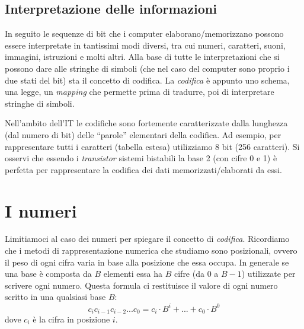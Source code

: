 \documentclass[class=book, crop=false, oneside]{standalone}
\begin{document}
\subsection{Interpretazione delle informazioni} In seguito le sequenze di bit che i computer elaborano/memorizzano possono essere interpretate in tantissimi modi diversi, tra cui numeri, caratteri, suoni, immagini, istruzioni e molti altri. Alla base di tutte le interpretazioni che si possono dare alle stringhe di simboli (che nel caso del computer sono proprio i due stati del bit) sta il concetto di codifica. La \emph{codifica} è appunto uno schema, una legge, un \emph{mapping} che permette prima di tradurre, poi di interpretare stringhe di simboli.

Nell’ambito dell’IT le codifiche sono fortemente caratterizzate dalla lunghezza (dal numero di bit) delle “parole” elementari della codifica. Ad esempio, per rappresentare tutti i caratteri (tabella  estesa) utilizziamo  8 bit (256 caratteri). Si osservi che essendo i \emph{transistor} sistemi bistabili la base 2 (con cifre 0 e 1) è perfetta per rappresentare la codifica dei dati memorizzati/elaborati da essi.

\section{I numeri}
Limitiamoci al caso dei numeri per spiegare il concetto di \emph{codifica}. Ricordiamo che i metodi di rappresentazione numerica che studiamo sono posizionali, ovvero il peso di ogni cifra varia in base alla posizione che essa occupa. In generale se una base è composta da \(B\) elementi essa ha \(B\) cifre (da 0 a \(B-1\)) utilizzate per scrivere ogni numero. Questa formula ci restituisce il valore di ogni numero scritto in una qualsiasi base \(B\):
\begin{equation*}
	c_{i} c_{i-1} c_{i-2}... c_{0}=c_{i}\cdot B^{i}+...+c_{0}\cdot B^{0}
\end{equation*}
dove \(c_{i}\) è la cifra in posizione \(i\).
\end{document}
